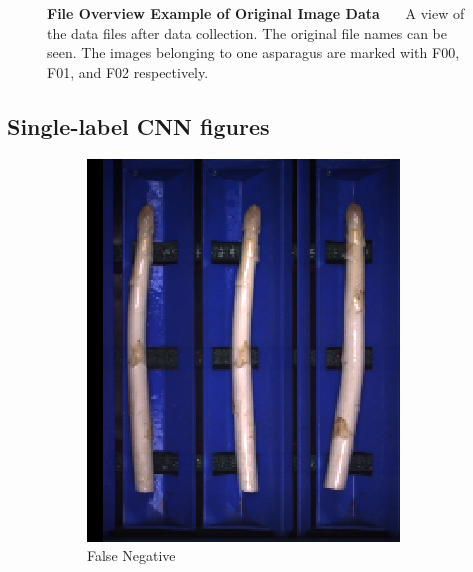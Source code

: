\begin{figure}[h]
	\decoRule
	\caption[File Overview Example of Original Image Data]{\textbf{File Overview Example of Original Image Data}~~~ A view of the data files after data collection. The original file names can be seen. The images belonging to one asparagus are marked with F00, F01, and F02 respectively.}
	\label{fig:Original_Data_Overview}
\end{figure}

\subsection{Single-label CNN figures}
\label{sec:AdditionalSingleLabelCNN}

\begin{figure}[!htb]
	\centering
	\begin{subfigure}{0.3\textwidth}
		\includegraphics[width=0.9\linewidth]{Figures/appendix/violet_falsenegative_01.png}
		\vspace{-5pt}
		\caption{False Negative}
	\end{subfigure}
	\begin{subfigure}{0.3\textwidth}

\end{subfigure}
\end{figure}
